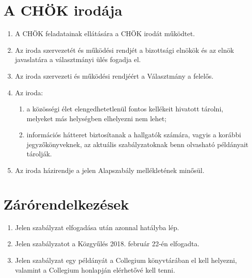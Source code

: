 \documentclass{../styles/rulebook}
\begin{document}
\section{A CHÖK irodája}

\begin{enumerate}
	\item A CHÖK feladatainak ellátására a CHÖK irodát működtet.
	\item Az iroda szervezetét és működési rendjét a bizottsági elnökök és az elnök javaslatára a választmányi ülés fogadja el.
	\item Az iroda szervezeti és működési rendjéért a Választmány a felelős.
	\item Az iroda:
	\begin{enumerate}
		\item a közösségi élet elengedhetetlenül fontos kellékeit hivatott tárolni, melyeket más helységben elhelyezni nem lehet;
		\item információs hátteret biztosítanak a hallgatók számára, vagyis a korábbi jegyzőkönyveknek, az aktuális szabályzatoknak benn olvasható példányait tárolják.
	\end{enumerate}
	\item Az iroda házirendje a jelen Alapszabály mellékletének minősül.
\end{enumerate}


\section{Zárórendelkezések}

\begin{enumerate}
	\item Jelen szabályzat elfogadása után azonnal hatályba lép.
	\item Jelen szabályzatot a Közgyűlés 2018. február 22-én elfogadta.
	\item Jelen szabályzat egy példányát a Collegium könyvtárában el kell helyezni, valamint a Collegium honlapján elérhetővé kell tenni.
\end{enumerate}
\end{document}
